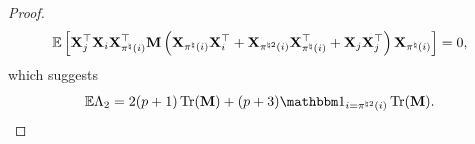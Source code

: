 \documentclass[11pt]{article}
\begin{document}
\begin{proof}
\[\mathbb{E}
\left[
 \mathbf{X}_j^{\top}\mathbf{X}_i
\mathbf{X}_{\pi^{\natural}(i)}^{\top} \mathbf{M}
\left(
\mathbf{X}_{\pi^{\natural}(i)}\mathbf{X}_{i}^{\top}
+ \mathbf{X}_{\pi^{\natural 2}(i)}\mathbf{X}_{\pi^{\natural}(i)}^{\top}
+ \mathbf{X}_{j}\mathbf{X}_{j}^{\top}
\right)
\mathbf{X}_{\pi^{\natural}(i)}
\right]= 0,
\]
which suggests
\[
\Expc \Lambda_2 =
2(p+1) \trace(\bM)+
(p+3)\Ind_{i = \pi^{\natural 2}(i)} \trace(\bM).
\]

\newpage


\end{proof}
\end{document}
